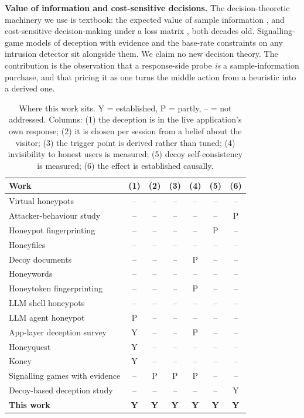 \textbf{Value of information and cost-sensitive decisions.} The decision-theoretic
machinery we use is textbook: the expected value of sample information
\cite{howard1966information}, and cost-sensitive decision-making under a loss
matrix \cite{elkan2001foundations}, both decades old. Signalling-game models of
deception with evidence \cite{pawlick2019leaky} and the base-rate constraints on
any intrusion detector \cite{axelsson2000baserate} sit alongside them. We claim no
new decision theory. The contribution is the observation that a response-side
probe \emph{is} a sample-information purchase, and that pricing it as one turns the
middle action from a heuristic into a derived one. \begin{table}[t]
\centering
\small
\setlength{\tabcolsep}{4pt}
\caption{Where this work sits. Y = established, P = partly, -- = not addressed. Columns: (1) the deception is in the live application's own response; (2) it is chosen per session from a belief about the visitor; (3) the trigger point is derived rather than tuned; (4) invisibility to honest users is measured; (5) decoy self-consistency is measured; (6) the effect is established causally.}
\label{tab:positioning}
\begin{tabular}{lcccccc}
\toprule
Work & (1) & (2) & (3) & (4) & (5) & (6) \\
\midrule
Virtual honeypots \cite{provos2004honeyd} & -- & -- & -- & -- & -- & -- \\
Attacker-behaviour study \cite{barron2017picky} & -- & -- & -- & -- & -- & P \\
Honeypot fingerprinting \cite{vetterl2018bitter} & -- & -- & -- & -- & P & -- \\
Honeyfiles \cite{yuill2004honeyfiles} & -- & -- & -- & -- & -- & -- \\
Decoy documents \cite{bowen2009baiting} & -- & -- & -- & P & -- & -- \\
Honeywords \cite{juels2013honeywords} & -- & -- & -- & -- & -- & -- \\
Honeytoken fingerprinting \cite{srinivasa2020honeytoken} & -- & -- & -- & P & -- & -- \\
LLM shell honeypots \cite{sladic2024shellm} & -- & -- & -- & -- & -- & -- \\
LLM agent honeypot \cite{reworr2024llmagent} & P & -- & -- & -- & -- & -- \\
App-layer deception survey \cite{kahlhofer2024applayer} & Y & -- & -- & P & -- & -- \\
Honeyquest \cite{kahlhofer2024honeyquest} & Y & -- & -- & -- & -- & -- \\
Koney \cite{kahlhofer2025koney} & Y & -- & -- & -- & -- & -- \\
Signalling games with evidence \cite{pawlick2019leaky} & -- & P & P & P & -- & -- \\
Decoy-based deception study \cite{fergusonwalter2021examining} & -- & -- & -- & -- & -- & Y \\
\midrule
\textbf{This work} & \textbf{Y} & \textbf{Y} & \textbf{Y} & \textbf{Y} & \textbf{Y} & \textbf{Y} \\
\bottomrule
\end{tabular}
\end{table}

